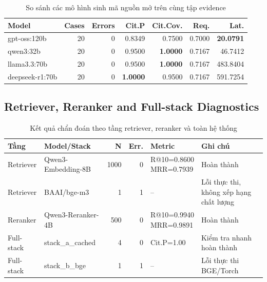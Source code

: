 \documentclass[conference]{IEEEtran}
\renewcommand{\arraystretch}{1.14}
\begin{document}
\begin{table}[t]
\caption{So sánh các mô hình sinh mã nguồn mở trên cùng tập evidence}
\label{tab:generator-results}
\centering
\scriptsize
\setlength{\tabcolsep}{2.5pt}
\begin{tabular}{lrrrrrr}
\toprule
\textbf{Model} & \textbf{Cases} & \textbf{Errors} & \textbf{Cit.P} & \textbf{Cit.Cov.} & \textbf{Req.} & \textbf{Lat.}\\
\midrule
gpt-oss:120b & 20 & 0 & 0.8349 & 0.7500 & 0.7000 & \textbf{20.0791}\\
qwen3:32b & 20 & 0 & 0.9500 & \textbf{1.0000} & 0.7167 & 46.7412\\
llama3.3:70b & 20 & 0 & 0.9500 & \textbf{1.0000} & 0.7167 & 483.8404\\
deepseek-r1:70b & 20 & 0 & \textbf{1.0000} & 0.9500 & 0.7167 & 591.7254\\
\bottomrule
\end{tabular}
\end{table}

\subsection{Retriever, Reranker and Full-stack Diagnostics}

\begin{table}[t]
\caption{Kết quả chẩn đoán theo tầng retriever, reranker và toàn hệ thống}
\label{tab:model-stage}
\centering
\tiny
\setlength{\tabcolsep}{2pt}
\renewcommand{\arraystretch}{1.15}
\begin{tabular}{p{}p{}rrm{}p{}}
\toprule
\textbf{Tầng} & \textbf{Model/Stack} & \textbf{N} & \textbf{Err.} & \textbf{Metric} & \textbf{Ghi chú}\\
\midrule
Retriever & Qwen3-Embedding-8B & 1000 & 0 & \shortstack[l]{R@10=0.8600\\MRR=0.7939} & Hoàn thành\\
Retriever & BAAI/bge-m3 & 1 & 1 & -- & Lỗi thực thi, không xếp hạng chất lượng\\
Reranker & Qwen3-Reranker-4B & 500 & 0 & \shortstack[l]{R@10=0.9940\\MRR=0.9891} & Hoàn thành\\
Full-stack & stack\_a\_cached & 4 & 0 & Cit.P=1.00 & Kiểm tra nhanh hoàn thành\\
Full-stack & stack\_b\_bge & 1 & 1 & -- & Lỗi thực thi BGE/Torch\\
\bottomrule
\end{tabular}
\end{table}
\end{document}
